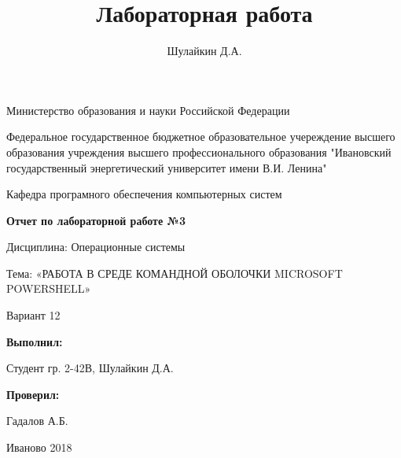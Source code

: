 \documentclass[a4paper]{article}
\title{Лабораторная работа}
\author{Шулайкин Д.А.}
\begin{document}
\onehalfspacing
\thispagestyle{empty}
\begin{center}
Министерство образования и науки Российской Федерации
\vspace{10pt}

Федеральное государственное бюджетное образовательное учереждение высшего образования учреждения высшего профессионального образования "Ивановский государственный энергетический университет имени В.И. Ленина"
\vspace{40pt}

Кафедра програмного обеспечения компьютерных систем
\vspace{40pt}

\textbf{Отчет по лабораторной работе №3}

Дисциплина: Операционные системы

Тема: «РАБОТА В СРЕДЕ КОМАНДНОЙ ОБОЛОЧКИ MICROSOFT POWERSHELL»

Вариант 12
\end{center}

\vspace{330pt}
\begin{flushright}
\textbf{Выполнил:}

Студент гр. 2-42В, Шулайкин Д.А.

\textbf{Проверил:}

Гадалов А.Б.
\end{flushright}
\vspace{40pt}
\begin{center}
Иваново 2018
\end{center}
\pagebreak
\end{document}

